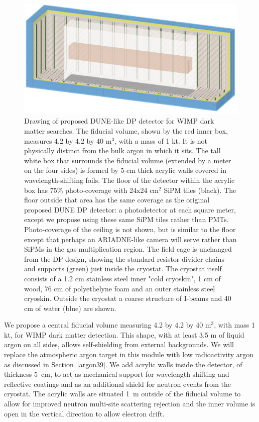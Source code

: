 \documentclass[a4paper,11pt]{article}
\begin{document}
\begin{figure}[ht]
\begin{centering}
\includegraphics[width=1.00\columnwidth]{Figures/DuneCADModelV5.png}
\par\end{centering}
\caption{Drawing of proposed DUNE-like DP detector for WIMP dark matter searches. The fiducial volume, shown by the red inner box, measures 4.2 by 4.2 by 40 m$^3$, with a mass of 1 kt. It is not physically distinct from the bulk argon in which it sits. The tall white box that surrounds the fiducial volume (extended by a meter on the four sides) is formed by 5-cm thick acrylic walls covered in wavelength-shifting foils. The floor of the detector within the acrylic box has 75\% photo-coverage with 24x24 cm$^2$ SiPM tiles (black). The floor outside that area has the same coverage as the original proposed DUNE DP detector: a photodetector at each square meter, except we propose using these same SiPM tiles rather than PMTs. Photo-coverage of the ceiling is not shown, but is similar to the floor except that perhaps an ARIADNE-like camera will serve rather than SiPMs in the gas multiplication region. The field cage is unchanged from the DP design, showing the standard resistor divider chains and supports (green) just inside the cryostat. The cryostat itself consists of a 1.2 cm stainless steel inner "cold cryoskin", 1 cm of wood, 76 cm of polyethelyne foam and an outer stainless steel cryoskin. Outside the cryostat a coarse structure of I-beams and 40 cm of water (blue) are shown. \label{fig:dunecad}}
\end{figure}

We propose a central fiducial volume measuring 4.2 by 4.2 by 40 m$^3$, with mass 1 kt, for WIMP dark matter detection. This shape, with at least 3.5 m of liquid argon on all sides, allows self-shielding from external backgrounds. We will replace the atmospheric argon target in this module with low radioactivity argon as discussed in Section~\ref{argon39}. We add acrylic walls inside the detector, of thickness 5~cm, to act as mechanical support for wavelength shifting and reflective coatings and as an additional shield for neutron events from the cryostat. The acrylic walls are situated 1~m outside of the fiducial volume to allow for improved neutron multi-site scattering rejection and the inner volume is open in the vertical direction to allow electron drift.
\end{document}
